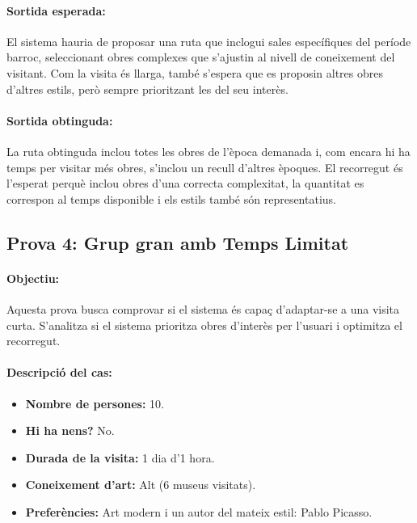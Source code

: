 \documentclass[a4paper]{article}
\begin{document}
	\paragraph{Sortida esperada:}
	El sistema hauria de proposar una ruta que inclogui sales específiques del període barroc, seleccionant obres complexes que s’ajustin al nivell de coneixement del visitant. Com la visita és llarga, també s'espera que es proposin altres obres d'altres estils, però sempre prioritzant les del seu interès.
	
	\paragraph{Sortida obtinguda:}
	La ruta obtinguda inclou totes les obres de l'època demanada i, com encara hi ha temps per visitar més obres, s'inclou un recull d'altres èpoques. El recorregut és l'esperat perquè inclou obres d'una correcta complexitat, la quantitat es correspon al temps disponible i els estils també són representatius. 
	
	\subsection{Prova 4: Grup gran amb Temps Limitat}
	
	\paragraph{Objectiu:} 
	Aquesta prova busca comprovar si el sistema és capaç d’adaptar-se a una visita curta. S’analitza si el sistema prioritza obres d'interès per l'usuari i optimitza el recorregut.
	
	\paragraph{Descripció del cas:} 
	
	\begin{itemize}
		\item \textbf{Nombre de persones:} 10.
		\item \textbf{Hi ha nens?} No.
		\item \textbf{Durada de la visita:} 1 dia d’1 hora.
		\item \textbf{Coneixement d’art:} Alt (6 museus visitats).
		\item \textbf{Preferències:} Art modern i un autor del mateix estil: Pablo Picasso.
	\end{itemize}
	
\end{document}
